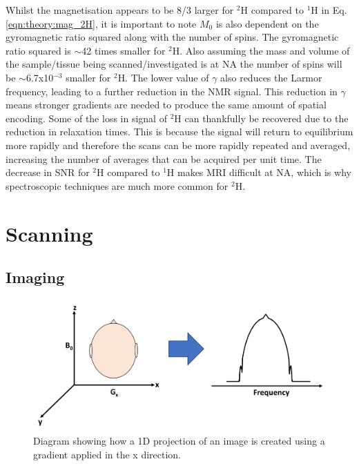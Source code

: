 Whilst the magnetisation appears to be 8/3 larger for $^2$H compared to $^1$H in Eq. \ref{eqn:theory:mag_2H}, it is important to note $M_0$ is also dependent on the gyromagnetic ratio squared along with the number of spins. The gyromagnetic ratio squared is $\sim$42 times smaller for $^2$H. Also assuming the mass and volume of the sample/tissue being scanned/investigated is at \ac{NA} the number of spins will be $\sim$6.7x10$^{-3}$ smaller for $^2$H. The lower value of $\gamma$ also reduces the Larmor frequency, leading to a further reduction in the NMR signal. This reduction in $\gamma$ means stronger gradients are needed to produce the same amount of spatial encoding. Some of the loss in signal of $^2$H can thankfully be recovered due to the reduction in relaxation times. This is because the signal will return to equilibrium more rapidly and therefore the scans can be more rapidly repeated and averaged, increasing the number of averages that can be acquired per unit time. The decrease in \ac{SNR} for $^2$H compared to $^1$H makes \ac{MRI} difficult at \ac{NA}, which is why spectroscopic techniques are much more common for $^2$H. 


\section{Scanning}   

\subsection{Imaging}
\label{Chap:Theory:Imaging}

\begin{figure}
    \centering
    \includegraphics[width=1\textwidth]{Figures/Theory/1D_Projection.png}
    \caption{Diagram showing how a 1D projection of an image is created using a gradient applied in the x direction.}
    \label{fig:theory:1D}
\end{figure}

